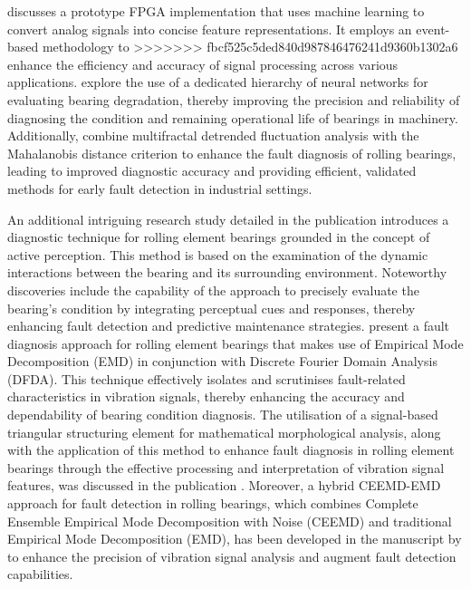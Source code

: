 \documentclass[sn-basic,pdflatex]{sn-jnl}
\theoremstyle{remark}
\theoremstyle{definition}
\begin{document}
\citet{WOS:000345844100102} discusses a prototype FPGA implementation
that uses machine learning to convert analog signals into concise
feature representations. It employs an event-based methodology to
>>>>>>> fbcf525c5ded840d987846476241d9360b1302a6
enhance the efficiency and accuracy of signal processing across various
applications. \citet{WOS:000396580800080} explore the use of a dedicated
hierarchy of neural networks for evaluating bearing degradation, thereby
improving the precision and reliability of diagnosing the condition and
remaining operational life of bearings in machinery. Additionally,
\citet{WOS:000320835800016} combine multifractal detrended fluctuation
analysis with the Mahalanobis distance criterion to enhance the fault
diagnosis of rolling bearings, leading to improved diagnostic accuracy
and providing efficient, validated methods for early fault detection in
industrial settings.

An additional intriguing research study detailed in the publication
\citet{WOS:000360994300029} introduces a diagnostic technique for
rolling element bearings grounded in the concept of active perception.
This method is based on the examination of the dynamic interactions
between the bearing and its surrounding environment. Noteworthy
discoveries include the capability of the approach to precisely evaluate
the bearing's condition by integrating perceptual cues and responses,
thereby enhancing fault detection and predictive maintenance strategies.
\citet{WOS:000343577703075} present a fault diagnosis approach for
rolling element bearings that makes use of Empirical Mode Decomposition
(EMD) in conjunction with Discrete Fourier Domain Analysis (DFDA). This
technique effectively isolates and scrutinises fault-related
characteristics in vibration signals, thereby enhancing the accuracy and
dependability of bearing condition diagnosis. The utilisation of a
signal-based triangular structuring element for mathematical
morphological analysis, along with the application of this method to
enhance fault diagnosis in rolling element bearings through the
effective processing and interpretation of vibration signal features,
was discussed in the publication \citep{WOS:000334316700001}. Moreover,
a hybrid CEEMD-EMD approach for fault detection in rolling bearings,
which combines Complete Ensemble Empirical Mode Decomposition with Noise
(CEEMD) and traditional Empirical Mode Decomposition (EMD), has been
developed in the manuscript by \citet{WOS:000412752200052} to enhance
the precision of vibration signal analysis and augment fault detection
capabilities.
\end{document}

